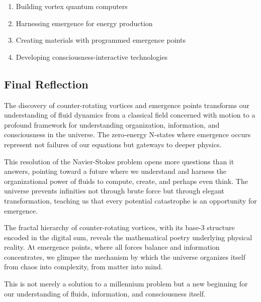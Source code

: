 \documentclass[12pt]{article}
\begin{document}
\begin{enumerate}
\item Building vortex quantum computers
\item Harnessing emergence for energy production
\item Creating materials with programmed emergence points
\item Developing consciousness-interactive technologies
\end{enumerate}

\subsection{Final Reflection}

The discovery of counter-rotating vortices and emergence points transforms our understanding of fluid dynamics from a classical field concerned with motion to a profound framework for understanding organization, information, and consciousness in the universe. The zero-energy N-states where emergence occurs represent not failures of our equations but gateways to deeper physics.

This resolution of the Navier-Stokes problem opens more questions than it answers, pointing toward a future where we understand and harness the organizational power of fluids to compute, create, and perhaps even think. The universe prevents infinities not through brute force but through elegant transformation, teaching us that every potential catastrophe is an opportunity for emergence.

The fractal hierarchy of counter-rotating vortices, with its base-3 structure encoded in the digital sum, reveals the mathematical poetry underlying physical reality. At emergence points, where all forces balance and information concentrates, we glimpse the mechanism by which the universe organizes itself from chaos into complexity, from matter into mind.

This is not merely a solution to a millennium problem but a new beginning for our understanding of fluids, information, and consciousness itself.
\end{document}
